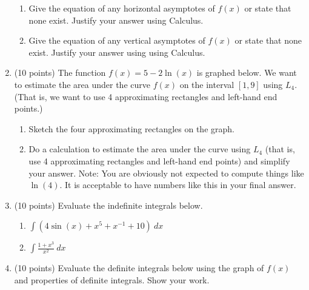 \documentclass[12pt]{article}
\begin{document}
\begin{enumerate}
\begin{enumerate}
\item Give the equation of any horizontal asymptotes of $f(x)$ or state that none exist. Justify your answer using Calculus. 
\vfill
\item  Give the equation of any vertical asymptotes of $f(x)$ or state that none exist. Justify your answer using  using Calculus. 
\vfill
\end{enumerate}

\newpage

\item (10 points) The function $f(x)=5-2 \ln(x)$ is graphed below. We want to estimate the area under the curve $f(x)$ on the interval $[1,9]$ using $L_4.$ (That is, we want to use 4 approximating rectangles and left-hand end points.) 
\begin{enumerate}
\item Sketch the four approximating rectangles on the graph. 

\vspace{0.5in}
\item Do a calculation to estimate the area under the curve using $L_4$ (that is, use 4 approximating rectangles and left-hand end points) and simplify your answer.  Note: You are obviously not expected to compute things like $\ln(4)$. It is acceptable to have numbers like this in your final answer.\\


\end{enumerate}
\newpage
\item (10 points) Evaluate the indefinite integrals below. 
	\begin{enumerate}
	\item $ \displaystyle \int (4\sin(x)+x^{5} + x^{-1}+10) \: dx$
	\vfill
	\item $ \displaystyle \int\frac{1+x^3}{x^2} \: dx $
	\vfill
	\end{enumerate}
	
\item (10 points) Evaluate the definite integrals below using the graph of $f(x)$ and properties of definite integrals. Show your work.


\end{enumerate}
\end{document}
